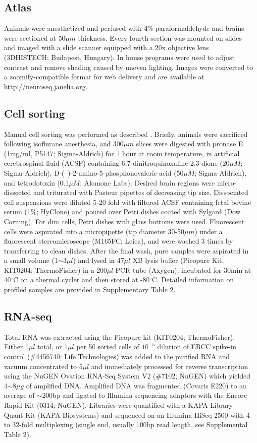 \subsection{Atlas}
Animals were anesthetized and perfused with 4\% paraformaldehyde and brains were sectioned at 50$\mu m$ thickness. Every fourth section was mounted on slides and imaged with a slide scanner equipped with a 20x objective lens (3DHISTECH; Budapest, Hungary). In house programs were used to adjust contrast and remove shading caused by uneven lighting. Images were converted to a zoomify-compatible format for web delivery and are available at http://neuroseq.janelia.org.

\subsection{Cell sorting}
Manual cell sorting was performed as described \citep{Hempel_2007, Sugino_2014}. Briefly, animals were sacrificed following isoflurane anesthesia, and 300$\mu m$ slices were digested with pronase E (1mg/ml, P5147; Sigma-Aldrich) for 1 hour at room temperature, in artificial cerebrospinal fluid (ACSF) containing 6,7-dinitroquinoxaline-2,3-dione (20$\mu M$; Sigma-Aldrich), D-(–)-2-amino-5-phosphonovaleric acid (50$\mu M$; Sigma-Aldrich), and tetrodotoxin (0.1$\mu M$; Alomone Labs). Desired brain regions were micro-dissected and triturated with Pasteur pipettes of decreasing tip size. Dissociated cell suspensions were diluted 5-20 fold with filtered ACSF containing fetal bovine serum (1\%; HyClone) and poured over Petri dishes coated with Sylgard (Dow Corning). For dim cells, Petri dishes with glass bottoms were used. Fluorescent cells were aspirated into a micropipette (tip diameter 30-50$\mu m$) under a fluorescent stereomicroscope (M165FC; Leica), and were washed 3 times by transferring to clean dishes. After the final wash, pure samples were aspirated in a small volume (1$\sim$3$\mu l$) and lysed in 47$\mu l$ XB lysis buffer (Picopure Kit, KIT0204; ThermoFisher) in a 200$\mu l$ PCR tube (Axygen), incubated for 30min at 40$^{\circ}$C on a thermal cycler and then stored at -80$^{\circ}$C. Detailed information on profiled samples are provided in Supplementary Table 2.

\subsection{RNA-seq}
Total RNA was extracted using the Picopure kit (KIT0204; ThermoFisher). Either 1$\mu l$ total, or 1$\mu l$ per 50 sorted cells of $10^{-5}$ dilution of ERCC spike-in control (\#4456740; Life Technologies) was added to the purified RNA and vacuum concentrated to 5$\mu l$ and immediately processed for reverse transcription using the NuGEN Ovation RNA-Seq System V2 (\#7102; NuGEN) which yielded 4$\sim$8$\mu g$ of amplified DNA. Amplified DNA was fragmented (Covaris E220) to an average of $\sim$200bp and ligated to Illumina sequencing adaptors with the Encore Rapid Kit (0314; NuGEN). Libraries were quantified with a KAPA Library Quant Kit (KAPA Biosystems) and sequenced on an Illumina HiSeq 2500 with 4 to 32-fold multiplexing (single end, usually 100bp read length, see Supplemental Table 2).

